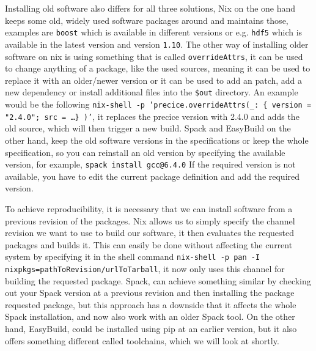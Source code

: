\documentclass{eceasst}
\begin{document}
Installing old software also differs for all three solutions, Nix on the one hand keeps some old, widely used software packages around and maintains those, examples are \texttt{boost} which is available in different versions or e.g. \texttt{hdf5} which is available in the latest version and version \texttt{1.10}.
The other way of installing older software on nix is using something that is called \texttt{overrideAttrs}, it can be used to change anything of a package, like the used sources, meaning it can be used to replace it with an older/newer version or it can be used to add an patch, add a new dependency or install additional files into the \texttt{\$out} directory.
An example would be the following \texttt{nix-shell -p 'precice.overrideAttrs(\_: \{ version = "2.4.0"; src = \ldots \} )'}, it replaces the precice version with 2.4.0 and adds the old source, which will then trigger a new build.
Spack and EasyBuild on the other hand, keep the old software versions in the specifications or keep the whole specification, so you can reinstall an old version by specifying the available version, for example, \texttt{spack install gcc@6.4.0}
If the required version is not available, you have to edit the current package definition and add the required version.

To achieve reproducibility, it is necessary that we can install software from a previous revision of the packages.
Nix allows us to simply specify the channel revision we want to use to build our software, it then evaluates the requested packages and builds it.
This can easily be done without affecting the current system by specifying it in the shell command \texttt{nix-shell -p pan -I nixpkgs=pathToRevision/urlToTarball}, it now only uses this channel for building the requested package.
Spack, can achieve something similar by checking out your Spack version at a previous revision and then installing the package requested package, but this approach has a downside that it affects the whole Spack installation, and now also work with an older Spack tool.
On the other hand, EasyBuild, could be installed using pip at an earlier version, but it also offers something different called toolchains, which we will look at shortly.
\end{document}
